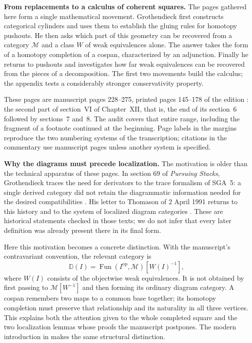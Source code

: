 \begingroup{}
\noindent\textbf{From replacements to a calculus of coherent squares.}
The pages gathered here form a single mathematical movement. Grothendieck first constructs categorical cylinders and uses them to establish the gluing rules for homotopy pushouts. He then asks which part of this geometry can be recovered from a category $\mathcal M$ and a class $W$ of weak equivalences alone. The answer takes the form of a homotopy completion of a cospan, characterized by an adjunction. Finally he returns to pushouts and investigates how far weak equivalences can be recovered from the pieces of a decomposition. The first two movements build the calculus; the appendix tests a considerably stronger conservativity property.

These pages are manuscript pages 228--275, printed pages 145--178 of the edition \citep{Grothendieck1990XIIc}: the second part of section~VI of Chapter~XII, that is, the end of its section~6 followed by sections~7 and~8. The audit covers that entire range, including the fragment of a footnote continued at the beginning. Page labels in the margins reproduce the two numbering systems of the transcription; citations in the commentary use manuscript pages unless another system is specified.

\medskip\noindent\textbf{Why the diagrams must precede localization.}
The motivation is older than the technical apparatus of these pages. In section 69 of \emph{Pursuing Stacks}, Grothendieck traces the need for derivators to the trace formalism of SGA~5: a single derived category did not retain the diagrammatic information needed for the desired compatibilities \citep[\S69, pp.~1--2]{Grothendieck1983}. His letter to Thomason of 2 April 1991 returns to this history and to the system of localized diagram categories \citep[\S2, pp.~5--6]{Grothendieck1991Letter}. These are historical statements checked in those texts; we do not infer that every later definition was already present there in its final form.

Here this motivation becomes a concrete distinction. With the manuscript's contravariant convention, the relevant category is
\[
 \mathbb D(I)=\operatorname{Fun}(I^{\mathrm{op}},\mathcal M)
                  [W(I)^{-1}],
\]
where $W(I)$ consists of the objectwise weak equivalences. It is not obtained by first passing to $\mathcal M[W^{-1}]$ and then forming its ordinary diagram category. A cospan remembers two maps to a common base together; its homotopy completion must preserve that relationship and its naturality in all three vertices. This explains both the attention given to the whole completed square and the two localization lemmas whose proofs the manuscript postpones. The modern introduction in \citet[pp.~313--315]{Groth2013} makes the same structural distinction.

